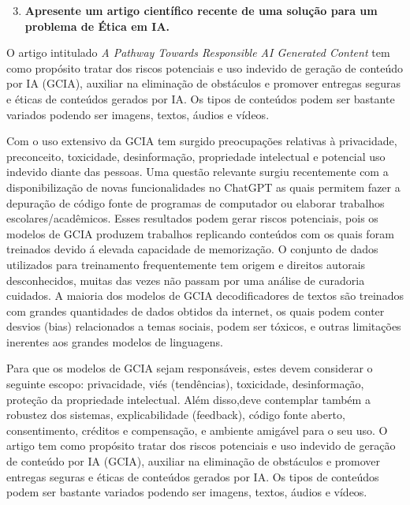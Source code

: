 \begin{enumerate}\setcounter{enumi}{2}\bfseries
    \item  \textbf{Apresente um artigo científico recente de uma solução para um problema de Ética em IA.}
\end{enumerate}

O artigo intitulado \textit{A Pathway Towards Responsible AI Generated Content} \cite{chen_fu_lyu} tem como propósito tratar dos riscos potenciais e uso indevido de geração de conteúdo 
por IA (GCIA), 
auxiliar na eliminação de obstáculos e promover entregas seguras e éticas de conteúdos gerados por IA. 
Os tipos de conteúdos podem ser bastante variados podendo ser imagens, textos, áudios e vídeos. 


Com o uso extensivo da GCIA tem surgido preocupações relativas à privacidade, preconceito, toxicidade, desinformação, 
propriedade intelectual e potencial uso indevido diante das pessoas. Uma questão relevante surgiu recentemente com a 
disponibilização de novas funcionalidades no ChatGPT as quais permitem fazer a depuração de código fonte de programas de 
computador ou elaborar trabalhos escolares/acadêmicos. Esses resultados podem gerar riscos potenciais, pois os modelos 
de GCIA produzem trabalhos replicando conteúdos com os quais foram treinados devido á elevada capacidade de memorização.
O conjunto de dados utilizados para 
treinamento frequentemente tem origem e direitos autorais desconhecidos, muitas das vezes não passam por uma análise 
de curadoria cuidados. A maioria dos modelos de GCIA decodificadores de textos são treinados com grandes quantidades 
de dados obtidos da internet, os quais podem conter desvios (bias) relacionados a temas sociais, podem ser tóxicos, 
e outras limitações inerentes aos grandes modelos de linguagens.

Para que os modelos de GCIA sejam responsáveis, estes devem considerar o seguinte escopo: 
privacidade, viés (tendências), toxicidade, desinformação, proteção da propriedade intelectual. 
Além disso,deve contemplar também a robustez dos sistemas, explicabilidade (feedback),
código fonte aberto, consentimento, créditos e compensação, e ambiente amigável para o seu uso.
O artigo \cite{chen_fu_lyu} tem como propósito tratar dos riscos potenciais e uso indevido de geração de conteúdo por IA (GCIA), auxiliar na eliminação de obstáculos e promover entregas seguras e éticas de conteúdos gerados por IA. Os tipos de conteúdos podem ser bastante variados podendo ser imagens, textos, áudios e vídeos. 


